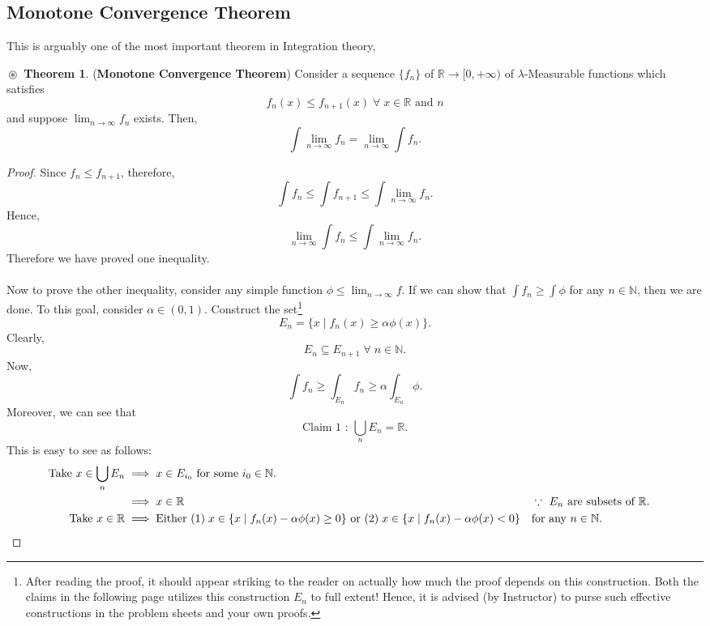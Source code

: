 \documentclass{article}
\theoremstyle{definition}
\newtheorem{theorem}{$\boxed{\boxed{\circledast}}$ Theorem}
\theoremstyle{remark}
\theoremstyle{definition}
\theoremstyle{definition}
\theoremstyle{definition}
\newcommand{\bunion}{\bigcup}
\newcommand{\where}{\;\vert\;}
\newcommand{\R}{\mathbb{R}}
\newcommand{\N}{\mathbb{N}}
\begin{document}
\subsection{Monotone Convergence Theorem}
This is arguably one of the most important theorem in Integration theory,
\begin{theorem}\label{T-5}
	(\textbf{Monotone Convergence Theorem}) Consider a sequence $ \{f_n\} $ of $ \R\to [0,+\infty)  $ of $ \lambda $-Measurable functions which satisfies
	\[f_n(x) \le f_{n+1}(x)\;\forall\;x\in \R \text{ and }n\]
	 and suppose $ \lim_{n\to \infty} f_n $ exists. Then,
	\[\int \lim_{n\to \infty} f_n = \lim_{n\to \infty} \int f_n.\]
\end{theorem}
\begin{proof}
	Since $ f_n \le f_{n+1} $, therefore,
	\[\int f_n \le \int f_{n+1}\le \int \lim_{n\to \infty} f_n.\]
	Hence,
	\[\lim_{n\to \infty} \int f_n \le \int \lim_{n\to \infty} f_n. \]
	Therefore we have proved one inequality.\\\\
	 Now to prove the other inequality, consider any simple function $ \phi \le \lim_{n\to \infty} f $. If we can show that $ \int f_n \ge \int \phi $ for any $ n \in \N $, then we are done. To this goal, consider $ \alpha \in (0,1) $. Construct the set\footnote{After reading the proof, it should appear striking to the reader on actually how much the proof depends on this construction. Both the claims in the following page utilizes this construction $ E_n $ to full extent! Hence, it is advised (by Instructor) to purse such effective constructions in the problem sheets and your own proofs.}
	\[\boxed{E_n = \{x\where f_n(x) \ge \alpha \phi(x)\}}.\]
	Clearly,
	\[E_n \subseteq E_{n+1}\;\forall\;n\in \N.\]
	Now,
	\begin{equation}\label{T-5.1}
		\int f_n \ge \int_{E_n} f_n \ge \alpha \int_{E_n}\phi.
	\end{equation}
	Moreover, we can see that
	\[\text{Claim 1 : }\bunion_{n} E_n = \R.\]
	This is easy to see as follows:
	\begin{align*}
		\text{Take }x\in \bunion_n E_n&\implies x\in E_{i_0} \text{ for some }i_0 \in \N.\\
		&\implies x\in \R &&\because\text{ $ E_n $ are subsets of $ \R $.}\\
		\text{Take }x\in \R &\implies \text{Either }(1)\; x\in \{x\where f_n(x) - \alpha \phi(x) \ge  0\} \text{ or } (2) \;x\in \{x\where f_n(x) - \alpha \phi(x) < 0\}  &&\text{for any $ n\in \N $.}\\

\end{align*}
\end{proof}
\end{document}
